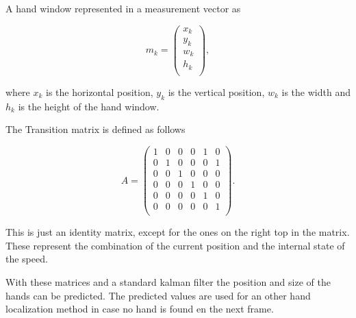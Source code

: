 A hand window represented in a measurement vector as

\begin{equation}
 m_k = \left(
\begin{array}{c}
	x_k \\ %
	y_k \\ %
	w_k \\ %
	h_k \\ %
\end{array} \right),
\end{equation}

where $x_k$ is the horizontal position, $y_k$ is the vertical position, $w_k$ is the width and $h_k$ is the height of the hand window.

The Transition matrix is defined as follows

\begin{equation}
 A = \left(
\begin{array}{cccccc}
	1 & 0 & 0 & 0 & 1 & 0 \\
	0 & 1 & 0 & 0 & 0 & 1 \\
	0 & 0 & 1 & 0 & 0 & 0 \\
	0 & 0 & 0 & 1 & 0 & 0 \\
	0 & 0 & 0 & 0 & 1 & 0 \\
	0 & 0 & 0 & 0 & 0 & 1 \\
\end{array} \right).
\end{equation}
	
This is just an identity matrix, except for the ones on the right top in the matrix. These represent the combination of the current position and the internal state of the speed.

With these matrices and a standard kalman filter the position and size of the hands can be predicted. The predicted values are used for an other hand localization method in case no hand is found en the next frame.




% 

